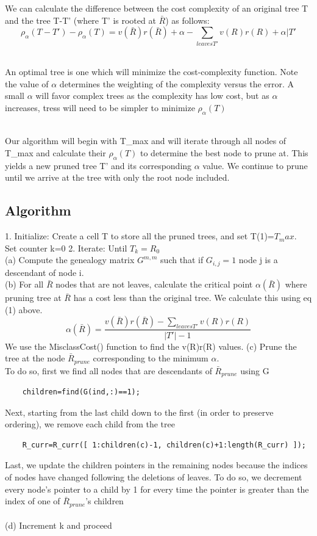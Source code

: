 \documentclass{article}
\begin{document}
We can calculate the difference between the cost complexity of an original tree T and the tree T-T' (where T' is rooted at $\bar{R}$) as follows:
\begin{equation}
\rho_{\alpha}(T-T') - \rho_{\alpha}(T)=  v(\bar{R})r(\bar{R}) + \alpha - \sum_{leaves T'}v(R)r(R) + \alpha|T' 
\end{equation}

\\An optimal tree is one which will minimize the cost-complexity function.  Note the value of $\alpha$ determines the weighting of the complexity versus the error. A small $\alpha$ will favor complex trees as the complexity has low cost, but as $\alpha$ increases, tress will need to be simpler to minimize $\rho_{\alpha}(T) $

\\Our algorithm will begin with T\_max and will iterate through all nodes of T\_max and calculate their $\rho_{\alpha}(T) $ to determine the best node to prune at. This yields a new pruned tree T' and its corresponding $\alpha$ value.  We continue to prune until we arrive at the tree with only the root node included.

\subsection*{Algorithm}
1.  Initialize: Create a cell T to store all the pruned trees, and set T(1)=$T_max$.  \\Set counter k=0
2.  Iterate: Until $T_k = R_0$
\\(a) Compute the genealogy matrix $G^{m,m}$ such that if $G_{i,j}=1$ node j is a descendant of node i.  
\\(b) For all $\bar{R}$ nodes that are not leaves, calculate the critical point $\alpha(\bar{R})$ where pruning tree at $\bar{R}$ has a cost less than the original tree.  We calculate this using eq (1) above.  
\[
\alpha(\bar{R}) =\dfrac{v(\bar{R})r(\bar{R}) - \sum_{leaves T'}v(R)r(R)}{|T'|-1}
\]
We use the MisclassCost() function to find the v(R)r(R) values.  
(c) Prune the tree at the node $\bar{R}_{prune}$ corresponding to the minimum $\alpha$.  \\
To do so, first we find all nodes that are descendants of $\bar{R}_{prune}$ using G
\begin{verbatim}
    children=find(G(ind,:)==1);
\end{verbatim}
Next, starting from the last child down to the first (in order to preserve ordering), we remove each child from the tree
\begin{verbatim}
    R_curr=R_curr([ 1:children(c)-1, children(c)+1:length(R_curr) ]);
\end{verbatim}
Last, we update the children pointers in the remaining nodes because the indices of nodes have changed following the deletions of leaves.  To do so, we decrement every node's pointer to a child by 1 for every time the pointer is greater than the index of one of $\bar{R}_{prune}$'s children
\\
\\
(d) Increment k and proceed
\end{document}
